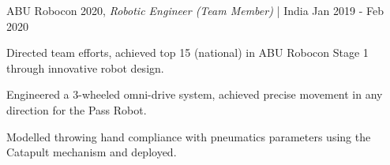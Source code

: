 \begin{cventries2}
  \cventrynew
    { ABU Robocon 2020, \textnormal{\textit{Robotic Engineer (Team Member)} | India  }} %
    {Jan 2019 - Feb 2020} %
    {
      \begin{cvitems} %
        \item {Directed team efforts, achieved top 15 (national) in ABU Robocon Stage 1 through innovative robot design.}
        \item {Engineered a 3-wheeled omni-drive system, achieved precise movement in any direction for the Pass Robot.} 
        \item { Modelled throwing hand compliance with pneumatics parameters using the Catapult mechanism and deployed.}
      \end{cvitems}
    }


\end{cventries2}

